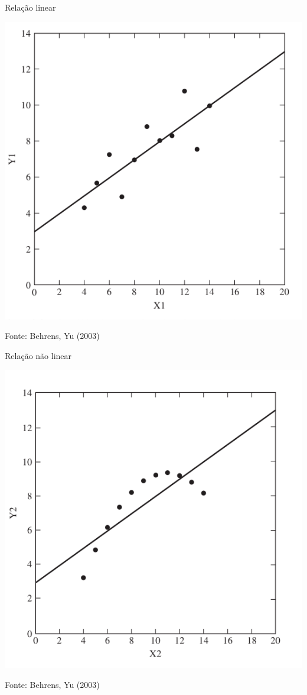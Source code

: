 \documentclass{beamer}
\begin{document}
\begin{frame}{Relação linear}
  \begin{center}
    \includegraphics[height=0.7\textheight]{EDA/eda-dispersao1}
  \end{center}

  \vfill
  \scriptsize
  \hfill Fonte: Behrens, Yu (2003)
\end{frame}

\begin{frame}{Relação não linear}
  \begin{center}
    \includegraphics[height=0.7\textheight]{EDA/eda-dispersao2}
  \end{center}

  \vfill
  \scriptsize
  \hfill Fonte: Behrens, Yu (2003)
\end{frame}
\end{document}
